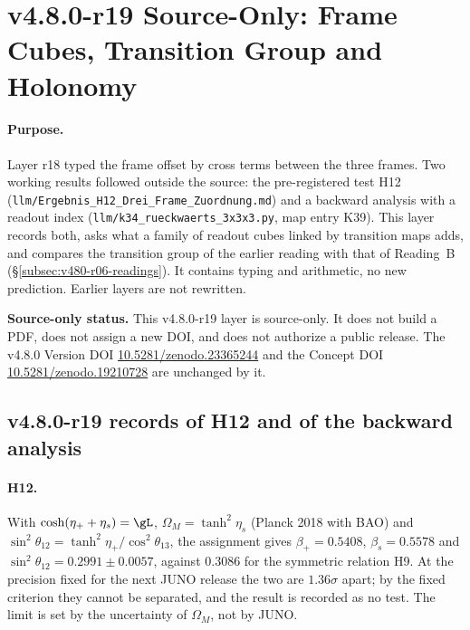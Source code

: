 \clearpage
\section*{v4.8.0-r19 Source-Only: Frame Cubes, Transition Group and Holonomy}
\label{sec:v480-r19-frame-cubes-holonomy}

\paragraph{Purpose.}
Layer r18 typed the frame offset by cross terms between the three frames.  Two working results followed outside the
source: the pre-registered test H12 (\texttt{llm/Ergebnis\_H12\_Drei\_Frame\_Zuordnung.md}) and a backward analysis
with a readout index (\texttt{llm/k34\_rueckwaerts\_3x3x3.py}, map entry K39).  This layer records both, asks what a
family of readout cubes linked by transition maps adds, and compares the transition group of the earlier reading with
that of Reading~B (\S\ref{subsec:v480-r06-readings}).  It contains typing and arithmetic, no new prediction.  Earlier
layers are not rewritten.

\noindent\textbf{Source-only status.}
This v4.8.0-r19 layer is source-only.  It does not build a PDF, does not assign a new DOI,
and does not authorize a public release.  The v4.8.0 Version DOI
\href{https://doi.org/10.5281/zenodo.23365244}{10.5281/zenodo.23365244} and the Concept DOI
\href{https://doi.org/10.5281/zenodo.19210728}{10.5281/zenodo.19210728} are unchanged by it.

\subsection*{v4.8.0-r19 records of H12 and of the backward analysis}
\label{subsec:v480-r19-records}

\paragraph{H12.}
With \(\cosh(\eta_++\eta_s)=\gL\), \(\Omega_M=\tanh^2\eta_s\) (Planck 2018 with BAO) and
\(\sin^2\theta_{12}=\tanh^2\eta_+/\cos^2\theta_{13}\), the assignment gives \(\beta_+=0.5408\), \(\beta_s=0.5578\) and
\(\sin^2\theta_{12}=0.2991\pm0.0057\), against \(0.3086\) for the symmetric relation H9.  At the precision fixed for
the next JUNO release the two are \(1.36\sigma\) apart; by the fixed criterion they cannot be separated, and the
result is recorded as no test.  The limit is set by the uncertainty of \(\Omega_M\), not by JUNO.


